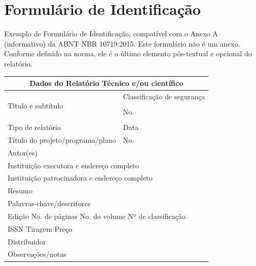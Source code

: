\documentclass[
	12pt,				%
	openright,			%
	twoside,			%
	a4paper,			%
	english,			%
	french,				%
	spanish,			%
	brazil,				%
	]{abntex2}
\begin{document}


\printindex

\chapter*[Formulário de Identificação]{Formulário de Identificação}
\label{formulado-identificacao}

Exemplo de Formulário de Identificação, compatível com o Anexo A (informativo)
da ABNT NBR 10719:2015. Este formulário não é um anexo. Conforme definido na
norma, ele é o último elemento pós-textual e opcional do relatório.

\bigskip

\begin{tabular}{|p{9cm}|p{5cm}|}
\hline
\multicolumn{2}{|c|}{\textbf{\large Dados do Relatório Técnico e/ou científico}}\\
\hline
\multirow{4}{10cm}[24pt]{Título e subtítulo}& Classificação de segurança\\
                   & \\
                   \cline{2-2}
                   & No.\\
                   & \\
				
\hline
Tipo de relatório & Data\\
\hline
Título do projeto/programa/plano & No.\\
\hline
\multicolumn{2}{|l|}{Autor(es)} \\
\hline
\multicolumn{2}{|l|}{Instituição executora e endereço completo} \\
\hline
\multicolumn{2}{|l|}{Instituição patrocinadora e endereço completo} \\
\hline
\multicolumn{2}{|l|}{Resumo}\\[3cm]
\hline
\multicolumn{2}{|l|}{Palavras-chave/descritores}\\
\hline
\multicolumn{2}{|l|}{
Edição \hfill No. de páginas \hfill No. do volume \hfill Nº de classificação \phantom{XXXX}} \\
\hline
\multicolumn{2}{|l|}{
ISSN \hfill \hfill Tiragem \hfill Preço \phantom{XXXXXXXX}} \\
\hline
\multicolumn{2}{|l|}{Distribuidor} \\
\hline
\multicolumn{2}{|l|}{Observações/notas}\\[3cm]
\hline
\end{tabular}
\end{document}
